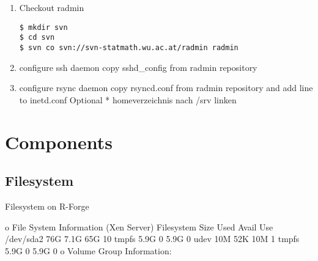 \documentclass[a4paper]{article}
\begin{document}
\begin{enumerate}
	\item Checkout radmin
\medskip

\begin{lstlisting}[frame=single, framerule=0.95pt]
$ mkdir svn
$ cd svn
$ svn co svn://svn-statmath.wu.ac.at/radmin radmin 
\end{lstlisting}
        \item configure ssh daemon 
copy sshd\_config from radmin repository
        \item configure rsync daemon 
copy rsyncd.conf from radmin repository and add line to inetd.conf
Optional * homeverzeichnis nach /srv linken
\end{enumerate}

 \section{Components}
 \label{sec:registration}

 \subsection{Filesystem}
 Filesystem on R-Forge 
 
o File System Information (Xen Server)
		Filesystem            Size  Used Avail Use%
		/dev/sda2              76G  7.1G   65G  10%
		tmpfs                 5.9G     0  5.9G   0%
		udev                   10M   52K   10M   1%
		tmpfs                 5.9G     0  5.9G   0%
	o Volume Group Information:
\end{document}
